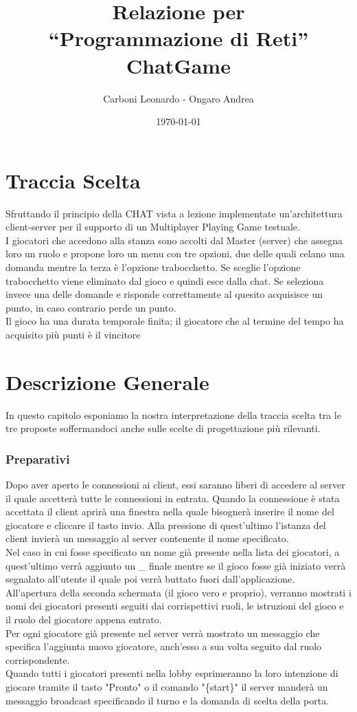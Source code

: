 \documentclass[a4paper,12pt]{report}
\title{Relazione per \\``Programmazione di Reti'' \\ ChatGame}
\author{Carboni Leonardo - Ongaro Andrea}
\date{\today}
\begin{document}
\maketitle

\tableofcontents
\thispagestyle{fancy}

\chapter{Traccia Scelta}
Sfruttando il principio della CHAT vista a lezione implementate un’architettura client-server per il supporto di un Multiplayer Playing Game testuale. \\
I giocatori che accedono alla stanza sono accolti dal Master (server) che assegna loro un ruolo e propone loro un menu con tre opzioni, due delle quali celano una domanda mentre la terza è l’opzione trabocchetto. Se sceglie l’opzione trabocchetto viene eliminato dal gioco e quindi esce dalla chat.
Se seleziona invece una delle domande e risponde correttamente al quesito acquisisce un punto, in caso contrario perde un punto.\\
Il gioco ha una durata temporale finita; il giocatore che al termine del tempo ha acquisito più punti è il vincitore

\chapter{Descrizione Generale}
In questo capitolo esponiamo la nostra interpretazione della traccia scelta tra le tre proposte soffermandoci anche sulle scelte di progettazione più rilevanti.

\subsection{Preparativi}
Dopo aver aperto le connessioni ai client, essi saranno liberi di accedere al server il quale accetterà tutte le connessioni in entrata. Quando la connessione è stata accettata il client aprirà una finestra nella quale bisognerà inserire il nome del giocatore e cliccare il tasto invio. Alla pressione di quest'ultimo l'istanza del client invierà un messaggio al server contenente il nome specificato. \\
Nel caso in cui fosse specificato un nome già presente nella lista dei giocatori, a quest'ultimo verrà aggiunto un \_ finale mentre se il gioco fosse già iniziato verrà segnalato all'utente il quale poi verrà buttato fuori dall'applicazione.\\
All'apertura della seconda schermata (il gioco vero e proprio), verranno mostrati i nomi dei giocatori presenti seguiti dai corrispettivi ruoli, le istruzioni del gioco e il ruolo del giocatore appena entrato.\\
Per ogni giocatore già presente nel server verrà mostrato un messaggio che specifica l'aggiunta nuovo giocatore, anch'esso a sua volta seguito dal ruolo corrispondente. \\
Quando tutti i giocatori presenti nella lobby esprimeranno la loro intenzione di giocare tramite il tasto "Pronto" o il comando "\{start\}"
il server manderà un messaggio broadcast specificando il turno e la domanda di scelta della porta.\clearpage
\end{document}
